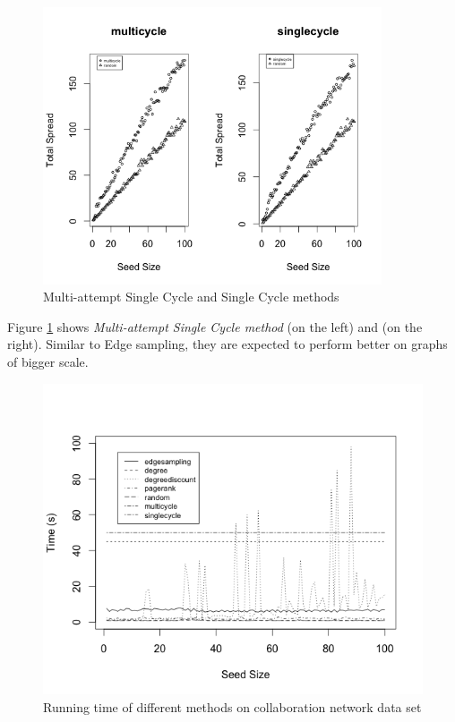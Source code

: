 \documentclass[english]{tktltiki}
\begin{document}
\begin{figure}[ht!]
\centering
\includegraphics[width=100mm]{figures/hep/multi-singlecycle.png}
\caption{Multi-attempt Single Cycle and Single Cycle methods}
\label{hep:multisingle}
\end{figure}
Figure \ref{hep:multisingle} shows \textit{Multi-attempt Single Cycle method} (on the left) and  (on the right). Similar to Edge sampling, they are expected to perform better on graphs of bigger scale.

 \begin{figure}[ht!]
\centering
\includegraphics[width=130mm]{figures/hep/times.png}
\caption{Running time of different methods on collaboration network data set}
\label{hep:times}
\end{figure}
\end{document}
